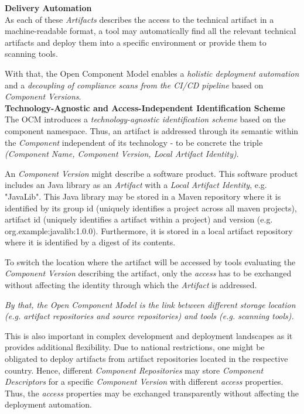 \noindent\textbf{Delivery Automation}\\
As each of these \emph{Artifacts} describes the access to the technical artifact in a machine-readable format, a tool may automatically find all the relevant technical artifacts and deploy them into a specific environment or provide them to scanning tools.\par
With that, the Open Component Model enables a \emph{holistic deployment automation} and a \emph{decoupling of compliance scans from the CI/CD pipeline} based on \emph{Component Versions}.\\ 

\noindent\textbf{Technology-Agnostic and Access-Independent Identification Scheme}\\
The OCM introduces a \emph{technology-agnostic identification scheme} based on the component namespace. Thus, an artifact is addressed through its semantic within the \emph{Component} independent of its technology - to be concrete the triple \emph{({Component Name}, {Component Version}, {Local Artifact Identity})}.\par
An \emph{Component Version} might describe a software product. This software product includes an Java library as an \emph{Artifact} with a \emph{Local Artifact Identity}, e.g. "JavaLib". This Java library may be stored in a Maven repository where it is identified by its group id (uniquely identifies a project across all maven projects), artifact id (uniquely identifies a artifact within a project) and version (e.g. org.example:javalib:1.0.0). Furthermore, it is stored in a local artifact repository where it is identified by a digest of its contents.\par
To switch the location where the artifact will be accessed by tools evaluating the \emph{Component Version} describing the artifact, only the \emph{access} has to be exchanged without affecting the identity through which the \emph{Artifact} is addressed.\par 
\emph{By that, the Open Component Model is the link between different storage location (e.g. artifact repositories and source repositories) and tools (e.g. scanning tools).}\par
This is also important in complex development and deployment landscapes as it provides additional flexibility. Due to national restrictions, one might be obligated to deploy artifacts from artifact repositories located in the respective country. Hence, different \emph{Component Repositories} may store \emph{Component Descriptors} for a specific \emph{Component Version} with different \emph{access} properties. Thus, the \emph{access} properties may be exchanged transparently without affecting the deployment automation.\\

